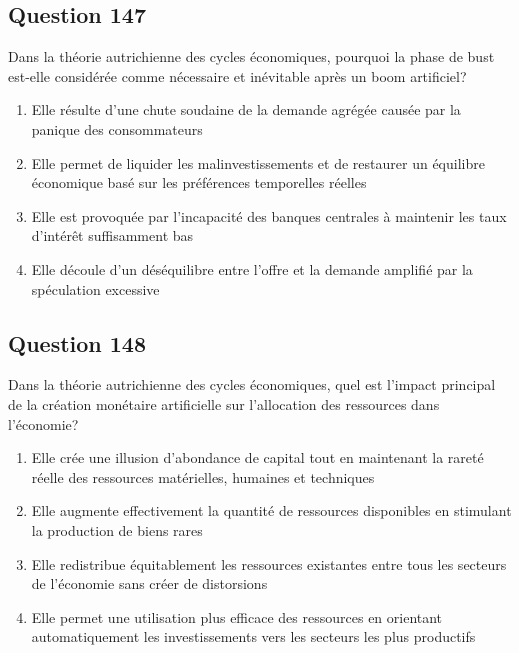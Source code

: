 \documentclass[12pt,a4paper]{article}
\begin{document}
\bigskip


\subsection*{Question 147}
Dans la théorie autrichienne des cycles économiques, pourquoi la phase de bust est-elle considérée comme nécessaire et inévitable après un boom artificiel?

\begin{enumerate}[label=\Alph*., leftmargin=*]
\item Elle résulte d'une chute soudaine de la demande agrégée causée par la panique des consommateurs
\item Elle permet de liquider les malinvestissements et de restaurer un équilibre économique basé sur les préférences temporelles réelles
\item Elle est provoquée par l'incapacité des banques centrales à maintenir les taux d'intérêt suffisamment bas
\item Elle découle d'un déséquilibre entre l'offre et la demande amplifié par la spéculation excessive
\end{enumerate}

\bigskip


\subsection*{Question 148}
Dans la théorie autrichienne des cycles économiques, quel est l'impact principal de la création monétaire artificielle sur l'allocation des ressources dans l'économie?

\begin{enumerate}[label=\Alph*., leftmargin=*]
\item Elle crée une illusion d'abondance de capital tout en maintenant la rareté réelle des ressources matérielles, humaines et techniques
\item Elle augmente effectivement la quantité de ressources disponibles en stimulant la production de biens rares
\item Elle redistribue équitablement les ressources existantes entre tous les secteurs de l'économie sans créer de distorsions
\item Elle permet une utilisation plus efficace des ressources en orientant automatiquement les investissements vers les secteurs les plus productifs
\end{enumerate}

\bigskip
\end{document}
